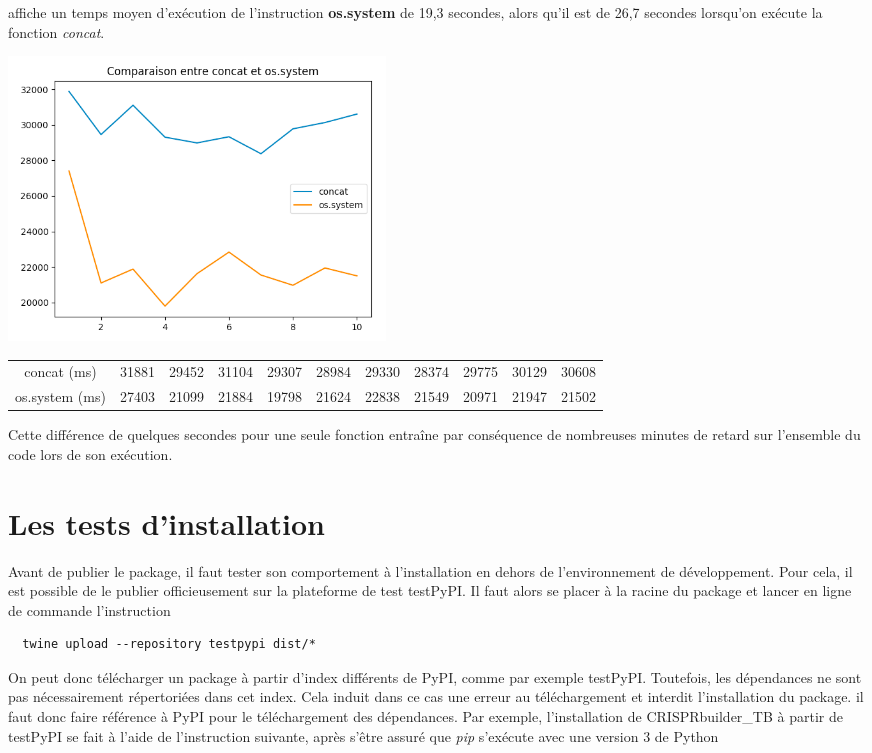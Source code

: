 \documentclass[twoside,a4paper,11pt,frenchb,openany]{report}
\begin{document}
affiche un temps moyen d'exécution de l'instruction \textbf{os.system} de 19,3 secondes, alors qu'il est de 26,7 secondes lorsqu'on exécute la fonction \textit{concat}.

\includegraphics[width=10cm]{comparaison_concat.png}

\begin{tabular}{c|c|c|c|c|c|c|c|c|c|c}
concat (ms) & 31881 & 29452 & 31104 & 29307 & 28984 & 29330 & 28374 & 29775 & 30129 & 30608 \\
os.system (ms) & 27403 & 21099 & 21884 & 19798 & 21624 & 22838 & 21549 & 20971 & 21947 & 21502
\end{tabular}

Cette différence de quelques secondes pour une seule fonction entraîne par conséquence de nombreuses minutes de retard sur l'ensemble du code lors de son exécution.







\section{Les tests d'installation}

Avant de publier le package, il faut tester son comportement à l'installation en dehors de l'environnement de développement. Pour cela, il est possible de le publier officieusement sur la plateforme de test testPyPI. Il faut alors se placer à la racine du package et lancer en ligne de commande l'instruction
\begin{verbatim}  twine upload --repository testpypi dist/*\end{verbatim}

On peut donc télécharger un package à partir d'index différents de PyPI, comme par exemple testPyPI. Toutefois, les dépendances ne sont pas nécessairement répertoriées dans cet index. Cela induit dans ce cas une erreur au téléchargement et interdit l'installation du package. il faut donc faire référence à PyPI pour le téléchargement des dépendances. Par exemple, l'installation de CRISPRbuilder\_TB à partir de testPyPI se fait à l'aide de l'instruction suivante, après s'être assuré que \textit{pip} s'exécute avec une version 3 de Python
\end{document}

